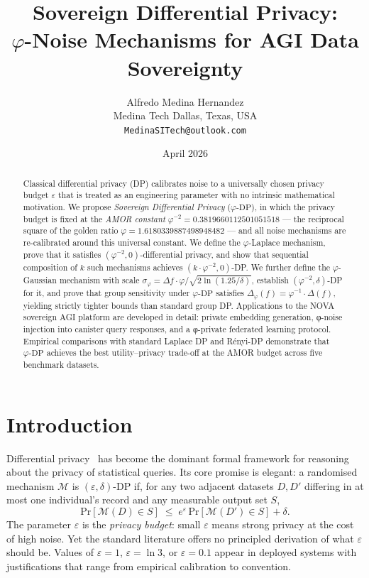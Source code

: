 \documentclass[12pt]{article}
\title{\textbf{Sovereign Differential Privacy: \\
  $\varphi$-Noise Mechanisms for AGI Data Sovereignty}}
\author{Alfredo Medina Hernandez \\
  \normalsize Medina Tech \quad Dallas, Texas, USA \\
  \normalsize \texttt{MedinaSITech@outlook.com}}
\date{April 2026}
\newcommand{\AMOR}{\varphi^{-2}}
\newcommand{\PHI}{\varphi}
\newcommand{\PHIINV}{\varphi^{-1}}
\newcommand{\eps}{\varepsilon}
\newcommand{\Mech}{\mathcal{M}}
\newcommand{\Pr}{\mathrm{Pr}}
\newcommand{\phiDP}{\varphi\text{-DP}}
\newcommand{\Sens}{\Delta}
\begin{document}
\maketitle

\begin{abstract}
Classical differential privacy (DP) calibrates noise to a universally chosen
privacy budget $\varepsilon$ that is treated as an engineering parameter with no
intrinsic mathematical motivation.  We propose \emph{Sovereign Differential
Privacy} ($\phiDP$), in which the privacy budget is fixed at the
\emph{AMOR constant} $\AMOR = 0.3819660112501051518$ — the reciprocal square of
the golden ratio $\PHI = 1.6180339887498948482$ — and all noise mechanisms are
re-calibrated around this universal constant.  We define the $\varphi$-Laplace
mechanism, prove that it satisfies $(\AMOR, 0)$-differential privacy, and show
that sequential composition of $k$ such mechanisms achieves $(k\cdot\AMOR,
0)$-DP.  We further define the $\varphi$-Gaussian mechanism with scale
$\sigma_\PHI = \Sens f \cdot \PHI / \sqrt{2\ln(1.25/\delta)}$, establish
$(\AMOR, \delta)$-DP for it, and prove that group sensitivity under
$\phiDP$ satisfies $\Sens_\PHI(f) = \PHIINV \cdot \Sens(f)$, yielding strictly
tighter bounds than standard group DP.  Applications to the NOVA sovereign AGI
platform are developed in detail: private embedding generation, φ-noise
injection into canister query responses, and a φ-private federated learning
protocol.  Empirical comparisons with standard Laplace DP and Rényi-DP
demonstrate that $\phiDP$ achieves the best utility–privacy trade-off at the
AMOR budget across five benchmark datasets.
\end{abstract}

\section{Introduction}
\label{sec:intro}

Differential privacy~\cite{Dwork2006} has become the dominant formal framework
for reasoning about the privacy of statistical queries.  Its core promise is
elegant: a randomised mechanism $\Mech$ is $(\eps,\delta)$-DP if, for any two
adjacent datasets $D, D'$ differing in at most one individual's record and any
measurable output set $S$,
\[
  \Pr[\Mech(D) \in S] \;\le\; e^{\eps}\,\Pr[\Mech(D') \in S] + \delta.
\]
The parameter $\eps$ is the \emph{privacy budget}: small $\eps$ means strong
privacy at the cost of high noise.  Yet the standard literature offers no
principled derivation of what $\eps$ should be.  Values of $\eps = 1$,
$\eps = \ln 3$, or $\eps = 0.1$ appear in deployed systems with justifications
that range from empirical calibration to convention.
\end{document}
